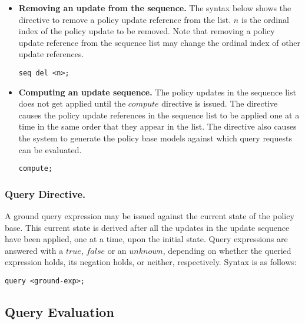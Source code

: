 \documentclass{llncs}
\begin{document}
\begin{itemize}
          \vspace{1mm}
          \item
            {\bf Removing an update from the sequence.} The syntax below
            shows the directive to remove a policy update reference from the
            list. $n$ is the ordinal index of the policy update to be
            removed. Note that removing a policy update reference from the
            sequence list may change the ordinal index of other update
            references.
                                                                
            \begin{verbatim}seq del <n>;\end{verbatim}

          \vspace{1mm}
          \item
            {\bf Computing an update sequence.} The policy updates in the
            sequence list does not get applied until the $compute$ directive
            is issued. The directive causes the policy update references in
            the sequence list to be applied one at a time in the same order
            that they appear in the list. The directive also causes the
            system to generate the policy base models against which query
            requests can be evaluated.

           \begin{verbatim}compute;\end{verbatim}
        \end{itemize}

      \subsubsection{Query Directive.}

        A ground query expression may be issued against the current state of
        the policy base. This current state is derived after all the updates
        in the update sequence have been applied, one at a time, upon the
        initial state. Query expressions are answered with a $true$, $false$
        or an $unknown$, depending on whether the queried expression holds,
        its negation holds, or neither, respectively. Syntax is as follows:

        \begin{verbatim}query <ground-exp>;\end{verbatim}

    \subsection{Query Evaluation}
\end{document}
